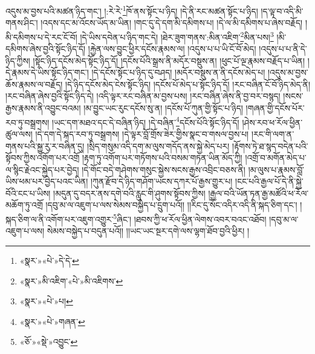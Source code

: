 འདུས་མ་བྱས་པའི་མཚན་ཉིད་གང་། །:རེ་རེ་\footnote{«སྣར་»«པེ་»དེ་དེ་}ཁོ་ནས་སྟོང་པ་ཉིད། །དེ་ནི་རང་མཚན་སྟོང་པ་ཉིད། །ད་ལྟ་བ་འདི་མི་གནས་ཤིང་། །འདས་དང་མ་འོངས་ཡོད་མ་ཡིན། །གང་དུ་དེ་དག་མི་དམིགས་པ། །དེ་ལ་མི་དམིགས་པ་ཞེས་བརྗོད། །མི་དམིགས་པ་དེ་རང་ངོ་བོ། །དེ་ཡིས་དབེན་པ་ཉིད་གང་དེ། །ཐེར་ཟུག་གནས་:མིན་འཇིག་\footnote{«སྣར་»མི་འཇིག་«པེ་»མི་འཇིགས་}མིན་པས།\footnote{«སྣར་»«པེ་»པ།} །མི་དམིགས་ཞེས་བྱའི་སྟོང་ཉིད་དོ། །རྐྱེན་ལས་བྱུང་ཕྱིར་དངོས་རྣམས་ལ། །འདུས་པ་པ་ཡི་ངོ་བོ་མེད། །འདུས་པ་པ་ནི་དེ་ཉིད་ཀྱིས། །སྟོང་ཉིད་དངོས་མེད་སྟོང་ཉིད་དོ། །དངོས་པོའི་སྒྲས་ནི་མདོར་བསྡུས་ན། །ཕུང་པོ་ལྔ་རྣམས་བརྗོད་པ་ཡིན། །དེ་རྣམས་དེ་ཡིས་སྟོང་ཉིད་གང་། །དེ་དངོས་སྟོང་པ་ཉིད་དུ་བཤད། །མདོར་བསྡུས་ན་ནི་དངོས་མེད་པ། །འདུས་མ་བྱས་ཆོས་རྣམས་ལ་བརྗོད། །དེ་ཉིད་དངོས་མེད་ངེས་སྟོང་ཉིད། །དངོས་པོ་མེད་པ་སྟོང་ཉིད་དོ། །རང་བཞིན་ངོ་བོ་ཉིད་མེད་ནི། །རང་བཞིན་ཞེས་བྱའི་སྟོང་ཉིད་དེ། །འདི་ལྟར་རང་བཞིན་མ་བྱས་པས། །རང་བཞིན་ཞེས་ནི་བྱ་བར་བསྙད། །སངས་རྒྱས་རྣམས་ནི་འབྱུང་བའམ། །མ་བྱུང་ཡང་རུང་དངོས་སུ་ན། །དངོས་པོ་ཀུན་གྱི་སྟོང་པ་ཉིད། །གཞན་གྱི་དངོས་པོར་རབ་ཏུ་བསྒྲགས། །ཡང་དག་མཐའ་དང་དེ་བཞིན་ཉིད། །དེ་བཞིན་\footnote{«སྣར་»«པེ་»གཞན་}དངོས་པོའི་སྟོང་ཉིད་དོ། །ཤེས་རབ་ཕ་རོལ་ཕྱིན་ཚུལ་ལས། །དེ་དག་དེ་སྐད་རབ་ཏུ་བསྒྲགས། །དེ་ལྟར་བློ་གྲོས་ཟེར་གྱིས་སྣང་བ་གསལ་བྱས་པ། །རང་གི་ལག་ན་གནས་པའི་སྐྱུ་རུ་ར་བཞིན་དུ། །སྲིད་གསུམ་འདི་དག་མ་ལུས་གདོད་ནས་སྐྱེ་མེད་པར། །རྟོགས་ཏེ་ཐ་སྙད་བདེན་པའི་སྟོབས་ཀྱིས་འགོག་པར་འགྲོ །རྟག་ཏུ་འགོག་པར་གཏོགས་པའི་བསམ་གཏན་ཡིན་མོད་ཀྱི། །འགྲོ་བ་མགོན་མེད་པ་ལ་སྙིང་རྗེའང་སྐྱེད་པར་བྱེད། །དེ་གོང་བདེ་གཤེགས་གསུང་སྐྱེས་སངས་རྒྱས་འབྲིང་བཅས་ནི། །མ་ལུས་པ་རྣམས་བློ་ཡིས་ཕམ་པར་བྱེད་པའང་ཡིན། །ཀུན་རྫོབ་དེ་ཉིད་གཤོག་ཡངས་དཀར་པོ་རྒྱས་གྱུར་པ། །ངང་པའི་རྒྱལ་པོ་དེ་ནི་སྐྱེ་བོའི་ངང་པ་ཡིས། །མདུན་དུ་བདར་ནས་དགེ་བའི་རླུང་གི་ཤུགས་སྟོབས་ཀྱིས། །རྒྱལ་བའི་ཡོན་ཏན་རྒྱ་མཚོའི་ཕ་རོལ་མཆོག་ཏུ་འགྲོ །དབུ་མ་ལ་འཇུག་པ་ལས་སེམས་བསྐྱེད་པ་དྲུག་པའོ།། །།རིང་དུ་སོང་འདིར་འདི་ནི་སྐད་ཅིག་དང་། །སྐད་ཅིག་ལ་ནི་འགོག་པར་འཇུག་འགྱུར་\footnote{«ཅོ་»«སྡེ་»འབྱུང་}ཞིང་། །ཐབས་ཀྱི་ཕ་རོལ་ཕྱིན་ལེགས་འབར་བའང་འཐོབ། །དབུ་མ་ལ་འཇུག་པ་ལས། སེམས་བསྐྱེད་པ་བདུན་པའོ།། །།ཡང་ཡང་སྔར་དགེ་ལས་ལྷག་ཐོབ་བྱའི་ཕྱིར། །
